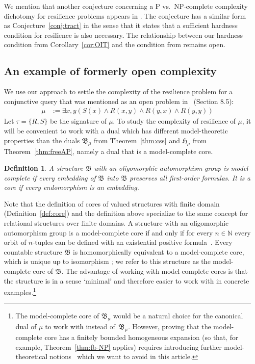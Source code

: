 \documentclass[nonacm]{acmart}
\newcommand{\bB}{{\mathfrak B}}
\newcommand{\bH}{{\mathfrak H}}
\newtheorem{definition}[theorem]{Definition}
\begin{document}
We mention that another conjecture concerning a P vs.\ NP-complete complexity dichotomy for resilience problems appears in \cite[Conjecture 7.7]{LatestResilience}. The conjecture has a similar form as Conjecture~\ref{conj:tract} in the sense that it states that a sufficient hardness condition for resilience is also necessary. The relationship between our hardness condition from Corollary~\ref{cor:OIT} and the condition from \cite{LatestResilience} remains open.

\subsection{An example of formerly open complexity}\label{sect:expl}

We use our approach to settle the complexity of the resilience
problem for a conjunctive query that was mentioned as an open problem in~\cite{NewResilience} (Section 8.5):
\begin{align}
    \mu & := \exists x,y (S(x) \wedge R(x,y) \wedge R(y,x) \wedge R(y,y)) \label{eq:mu1}
\end{align}
%
Let $\tau = \{R,S\}$ be the signature of $\mu$. 
To study the complexity of resilience of $\mu$, it will be convenient to work with 
a dual which has different 
model-theoretic properties than the duals $\bB_\mu$ from Theorem~\ref{thm:css} and $\bH_\mu$ from Theorem~\ref{thm:freeAP}, namely a dual that is a model-complete core.

\begin{definition}\label{def:mc-core}
A structure
$\bB$ with an oligomorphic automorphism group is \emph{model-complete} if every embedding of $\bB$ into $\bB$ preserves all first-order formulas. It is a \emph{core} if every endomorphism is an embedding.
\end{definition}

Note that the definition of cores of valued structures with finite domain (Definition~\ref{def:core}) and the definition above specialize to the same concept for relational structures over finite domains. 
A structure with an oligomorphic automorphism group is a model-complete core if and only if for every $n \in {\mathbb N}$ every orbit of $n$-tuples 
can be defined with an existential positive formula~\cite{Book}.
Every countable structure $\bB$ is homomorphically equivalent to a model-complete core, which is unique up to isomorphism \cite{Cores-journal, Book}; we refer to this structure as the model-complete core of $\bB$.
The advantage of working with model-complete cores is that the structure is in a sense `minimal' and therefore easier to work with in concrete examples.\footnote{The model-complete core of $\bB_\mu$ would be a natural choice for the canonical dual of $\mu$ to work with instead of~$\bB_\mu$. However, proving that the model-complete core has a finitely bounded homogeneous expansion (so that, for example, Theorem~\ref{thm:fb-NP} applies) requires introducing further model-theoretical notions~\cite{MottetPinskerCores} which we want to avoid in this article.} 
\end{document}
